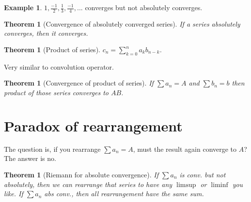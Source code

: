 \documentclass[12pt]{article}
\theoremstyle{definition}
\newtheorem{example}[definition]{Example}
\theoremstyle{plain}
\newtheorem{theorem}[definition]{Theorem}
\begin{document}
\begin{example}
$1, \frac{-1}{2}, \frac{1}{3}, \frac{-1}{4},...$ converges but not absolutely converges.
\end{example}

\begin{theorem}[Convergence of absolutely converged series]
If a series absolutely converges, then it converges.
\end{theorem}

\begin{theorem}[Product of series]
$c_n = \sum_{k=0}^na_kb_{n-k}$.
\end{theorem}

\begin{note}
Very similar to convolution operator.
\end{note}

\begin{theorem}[Convergence of product of series]
If $\sum a_n = A$ and $\sum b_n = b$ then product of those series converges to $AB$.
\end{theorem}

\section{Paradox of rearrangement}

\begin{note}
The question is, if you rearrange $\sum a_n= A$, must the result again converge to $A$? The answer is no.
\end{note}

\begin{theorem}[Riemann for absolute convergence]
If $\sum a_n$ is conv. but not absolutely, then we can rearrange that series to have any $\limsup$ or $\liminf$ you like. If $\sum a_n$ abs conv., then all rearrangement have the same sum.
\end{theorem}
\end{document}

